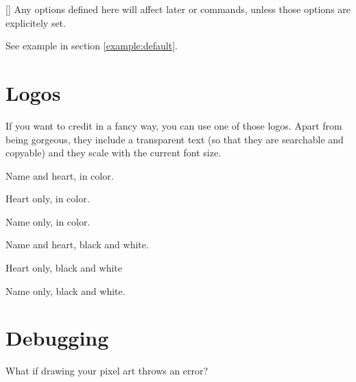 \documentclass[
  load-preamble-,
  babel-options=english,
  add-index=true,
]{cnltx-doc}
\begin{document}
\begin{commands}
  [] Any options defined here will affect later  or  commands, unless those options are explicitely set.

  See example in section \ref{example:default}.
\end{commands}

\section{Logos}

If you want to credit  in a fancy way, you can use one of those logos. Apart from being gorgeous, they include a transparent text (so that they are searchable and copyable) and they scale with the current font size.

\begin{multicols}{2}
\begin{commands}
  \pixelartlogo{}
  Name and heart, in color.

  \pixelartheart{}
  Heart only, in color.

  \pixelartname{}
  Name only, in color.

  \pixelartlogobw{}
  Name and heart, black and white.

  \pixelartheartbw{}
  Heart only, black and white

  \pixelartnamebw{}
  Name only, black and white.
\end{commands}
\end{multicols}

\section{Debugging}

What if drawing your pixel art throws an error?
\end{document}
